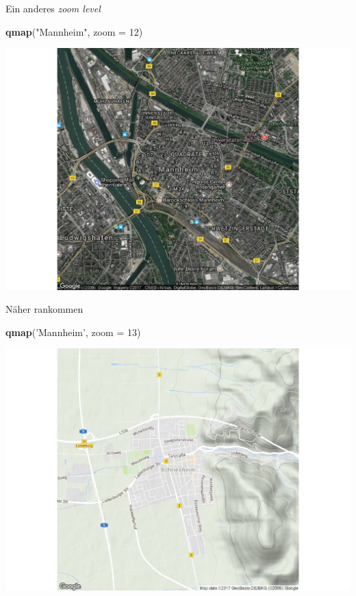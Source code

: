 \documentclass[ignorenonframetext,]{beamer}
\newenvironment{Shaded}{}{}
\newcommand{\KeywordTok}[1]{\textcolor[rgb]{0.00,0.44,0.13}{\textbf{{#1}}}}
\newcommand{\DataTypeTok}[1]{\textcolor[rgb]{0.56,0.13,0.00}{{#1}}}
\newcommand{\DecValTok}[1]{\textcolor[rgb]{0.25,0.63,0.44}{{#1}}}
\newcommand{\StringTok}[1]{\textcolor[rgb]{0.25,0.44,0.63}{{#1}}}
\newcommand{\NormalTok}[1]{{#1}}
\begin{document}
\begin{frame}[fragile]{Ein anderes \emph{zoom level}}

\begin{Shaded}
\begin{Highlighting}[]
\KeywordTok{qmap}\NormalTok{(}\StringTok{"Mannheim"}\NormalTok{, }\DataTypeTok{zoom =} \DecValTok{12}\NormalTok{)}
\end{Highlighting}
\end{Shaded}

\includegraphics{R_intern_files/figure-beamer/unnamed-chunk-264-1.pdf}

\end{frame}

\begin{frame}[fragile]{Näher rankommen}

\begin{Shaded}
\begin{Highlighting}[]
\KeywordTok{qmap}\NormalTok{(}\StringTok{'Mannheim'}\NormalTok{, }\DataTypeTok{zoom =} \DecValTok{13}\NormalTok{)}
\end{Highlighting}
\end{Shaded}

\includegraphics{R_intern_files/figure-beamer/unnamed-chunk-265-1.pdf}

\end{frame}
\end{document}
